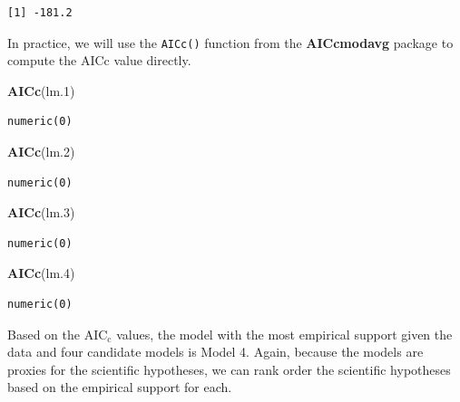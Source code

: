 \documentclass[]{book}
\newenvironment{Shaded}{\begin{snugshade}}{\end{snugshade}}
\newcommand{\FloatTok}[1]{\textcolor[rgb]{0.00,0.00,0.81}{#1}}
\newcommand{\KeywordTok}[1]{\textcolor[rgb]{0.13,0.29,0.53}{\textbf{#1}}}
\newcommand{\NormalTok}[1]{#1}
\begin{document}
\begin{verbatim}
[1] -181.2
\end{verbatim}

In practice, we will use the \texttt{AICc()} function from the \textbf{AICcmodavg} package to compute the AICc value directly.

\begin{Shaded}
\begin{Highlighting}[]
\KeywordTok{AICc}\NormalTok{(lm}\FloatTok{.1}\NormalTok{)}
\end{Highlighting}
\end{Shaded}

\begin{verbatim}
numeric(0)
\end{verbatim}

\begin{Shaded}
\begin{Highlighting}[]
\KeywordTok{AICc}\NormalTok{(lm}\FloatTok{.2}\NormalTok{)}
\end{Highlighting}
\end{Shaded}

\begin{verbatim}
numeric(0)
\end{verbatim}

\begin{Shaded}
\begin{Highlighting}[]
\KeywordTok{AICc}\NormalTok{(lm}\FloatTok{.3}\NormalTok{)}
\end{Highlighting}
\end{Shaded}

\begin{verbatim}
numeric(0)
\end{verbatim}

\begin{Shaded}
\begin{Highlighting}[]
\KeywordTok{AICc}\NormalTok{(lm}\FloatTok{.4}\NormalTok{)}
\end{Highlighting}
\end{Shaded}

\begin{verbatim}
numeric(0)
\end{verbatim}

Based on the \(\mathrm{AIC_c}\) values, the model with the most empirical support given the data and four candidate models is Model 4. Again, because the models are proxies for the scientific hypotheses, we can rank order the scientific hypotheses based on the empirical support for each.
\end{document}
